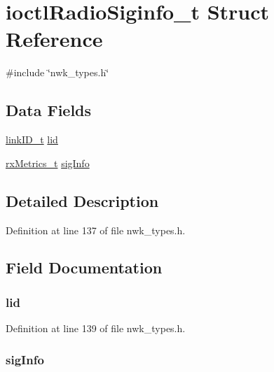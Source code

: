 \hypertarget{structioctlRadioSiginfo__t}{\section{ioctl\-Radio\-Siginfo\-\_\-t \-Struct \-Reference}
\label{structioctlRadioSiginfo__t}
}


{\ttfamily \#include \char`\"{}nwk\-\_\-types.\-h\char`\"{}}

\subsection*{\-Data \-Fields}
\begin{DoxyCompactItemize}
\item 
\hyperlink{nwk__types_8h_a542d45d12faba7ae8fd0c989ef2c8528}{link\-I\-D\-\_\-t} \hyperlink{structioctlRadioSiginfo__t_ac37c121af45cbf458e3af68c470b5531}{lid}
\item 
\hyperlink{structrxMetrics__t}{rx\-Metrics\-\_\-t} \hyperlink{structioctlRadioSiginfo__t_a87903a190e749b4aa6e73a2aa5d18ff1}{sig\-Info}
\end{DoxyCompactItemize}


\subsection{\-Detailed \-Description}


\-Definition at line 137 of file nwk\-\_\-types.\-h.



\subsection{\-Field \-Documentation}
\hypertarget{structioctlRadioSiginfo__t_ac37c121af45cbf458e3af68c470b5531}{
\subsubsection[{lid}]{ {\bf lid}}}\label{structioctlRadioSiginfo__t_ac37c121af45cbf458e3af68c470b5531}


\-Definition at line 139 of file nwk\-\_\-types.\-h.

\hypertarget{structioctlRadioSiginfo__t_a87903a190e749b4aa6e73a2aa5d18ff1}{
\subsubsection[{sig\-Info}]{ {\bf sig\-Info}}}\label{structioctlRadioSiginfo__t_a87903a190e749b4aa6e73a2aa5d18ff1}


